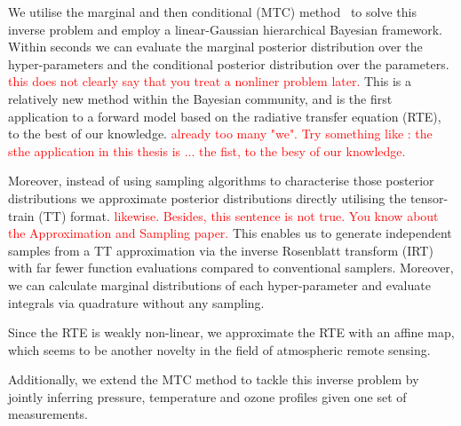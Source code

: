 We utilise the marginal and then conditional (MTC) method~\cite{fox2016fast} to solve this inverse problem and employ a linear-Gaussian hierarchical Bayesian framework.
Within seconds we can evaluate the marginal posterior distribution over the hyper-parameters and the conditional posterior distribution over the parameters. \textcolor{red}{this does not clearly say that you treat a nonliner problem later.}
This is a relatively new method within the Bayesian community, and is the first application to a forward model based on the radiative transfer equation (RTE), to the best of our knowledge. \textcolor{red}{already too many "we". Try something like : the sthe application in this thesis is ... the fist, to the besy of our knowledge.}

Moreover, instead of using sampling algorithms to characterise those posterior distributions we approximate posterior distributions directly utilising the tensor-train (TT) format. \textcolor{red}{likewise. Besides, this sentence is not true. You know about the Approximation and Sampling paper.}
This enables us to generate independent samples from a TT approximation via the inverse Rosenblatt transform (IRT) with far fewer function evaluations compared to conventional samplers.
Moreover, we can calculate marginal distributions of each hyper-parameter and evaluate integrals via quadrature without any sampling.

Since the RTE is weakly non-linear, we approximate the RTE with an affine map, which seems to be another novelty in the field of atmospheric remote sensing.

Additionally, we extend the MTC method to tackle this inverse problem by jointly inferring pressure, temperature and ozone profiles given one set of measurements.


